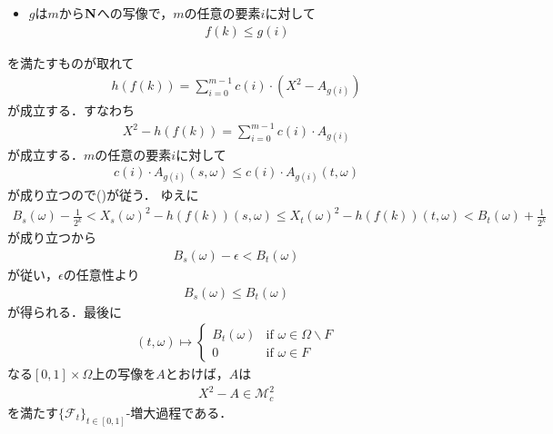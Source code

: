 \begin{sketch}
\begin{description}
\begin{itemize}
					\item $g$は$m$から$\mathbf{N}$への写像で，$m$の任意の要素$i$に対して
						\begin{align}
							f(k) \leq g(i)
						\end{align}
				\end{itemize}
				を満たすものが取れて
				\begin{align}
					h(f(k)) = \sum_{i=0}^{m-1} c(i) \cdot \left( X^{2} - A_{g(i)} \right)
				\end{align}
				が成立する．すなわち
				\begin{align}
					X^{2} - h(f(k)) = \sum_{i=0}^{m-1} c(i) \cdot A_{g(i)}
				\end{align}
				が成立する．$m$の任意の要素$i$に対して
				\begin{align}
					c(i) \cdot A_{g(i)}(s,\omega) 
					\leq c(i) \cdot A_{g(i)}(t,\omega) 
				\end{align}
				が成り立つので()が従う．
				ゆえに
				\begin{align}
					B_{s}(\omega) - \frac{1}{2^{k}}
					< {X_{s}(\omega)}^{2} - h(f(k))(s,\omega)
					\leq {X_{t}(\omega)}^{2} - h(f(k))(t,\omega)
					< B_{t}(\omega) + \frac{1}{2^{k}}
				\end{align}
				が成り立つから
				\begin{align}
					B_{s}(\omega) - \epsilon < B_{t}(\omega)
				\end{align}
				が従い，$\epsilon$の任意性より
				\begin{align}
					B_{s}(\omega) \leq B_{t}(\omega)
				\end{align}
				が得られる．最後に
				\begin{align}
					(t,\omega) \longmapsto
					\begin{cases}
						B_{t}(\omega) & \mbox{if } \omega \in \Omega \backslash F \\
						0 & \mbox{if } \omega \in F
					\end{cases}
				\end{align}
				なる$[0,1] \times \Omega$上の写像を$A$とおけば，$A$は
				\begin{align}
					X^{2} - A \in \mathscr{M}_{c}^{2}
				\end{align}
				を満たす$\{\mathscr{F}_{t}\}_{t \in [0,1]}$-増大過程である．
				

\end{description}
\end{sketch}
